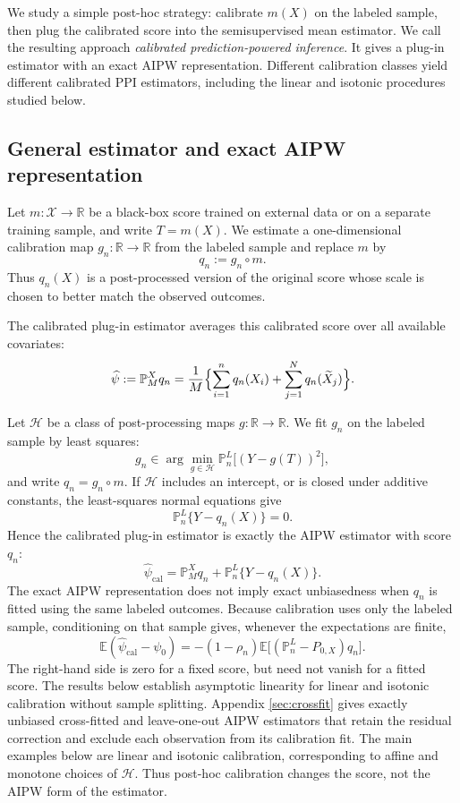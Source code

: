 \documentclass{article}
\theoremstyle{plain}
\theoremstyle{definition}
\newcommand{\E}{\mathbb{E}}
\newcommand{\1}{\mathbf{1}}
\newcommand{\psihat}{\widehat{\psi}_{\mathrm{cal}}}
\newcommand{\mtilde}{q_n}
\newcommand{\Pl}{\mathbb{P}^{L}_n}
\newcommand{\Pmx}{\mathbb{P}^{X}_M}
\newcommand{\Px}{P_{0,X}}
\begin{document}
We study a simple post-hoc strategy: calibrate \(m(X)\) on the labeled sample,
then plug the calibrated score into the semisupervised mean estimator. We call
the resulting approach \emph{calibrated prediction-powered inference}. It gives
a plug-in estimator with an exact AIPW representation. Different calibration
classes yield different calibrated PPI estimators, including the linear and
isotonic procedures studied below.

\subsection{General estimator and exact AIPW representation}
Let \(m:\mathcal X\to\mathbb R\) be a black-box score trained on external data
or on a separate training sample, and write \(T=m(X)\). We estimate a
one-dimensional calibration map \(g_n:\mathbb R\to\mathbb R\) from the labeled sample and
replace \(m\) by
\[
q_n := g_n\circ m .
\]
Thus \(q_n(X)\) is a post-processed version of the original score whose
scale is chosen to better match the observed outcomes.

The calibrated plug-in estimator averages this calibrated score over all
available covariates:
\begin{equation}
\label{eq:plugin}
\widehat\psi
:=
\Pmx q_n = \frac{1}{M}\Bigl\{\sum_{i=1}^n q_n(X_i)+\sum_{j=1}^N q_n(\widetilde X_j)\Bigr\}.
\end{equation}

Let \(\mathcal H\) be a class of post-processing maps
\(g:\mathbb R\to\mathbb R\). We fit \(g_n\) on the labeled sample by least
squares:
\begin{equation}
\label{eq:H-erm}
g_n \in \arg\min_{g\in\mathcal H}
\Pl\bigl[(Y-g(T))^2\bigr],
\end{equation}
and write \(\mtilde=g_n\circ m\). If \(\mathcal H\) includes an intercept, or
is closed under additive constants, the least-squares normal equations give
\[
\Pl\{Y-\mtilde(X)\}=0.
\]
Hence the calibrated plug-in estimator is exactly the AIPW estimator with score
\(\mtilde\):
\begin{equation}
\label{eqn::aipwcal}
\psihat
=
\Pmx\mtilde
+ \Pl\{Y-\mtilde(X)\}.
\end{equation}
The exact AIPW representation does not imply exact unbiasedness when \(q_n\)
is fitted using the same labeled outcomes. Because calibration uses only the
labeled sample, conditioning on that sample gives, whenever the expectations
are finite,
\[
\E(\psihat-\psi_0)
=-(1-\rho_n)\E\bigl[(\Pl-\Px)q_n\bigr].
\]
The right-hand side is zero for a fixed score, but need not vanish for a fitted
score. The results below establish asymptotic linearity for linear and
isotonic calibration without sample splitting. Appendix \ref{sec:crossfit}
gives exactly unbiased cross-fitted and leave-one-out AIPW estimators that
retain the residual correction and exclude each observation from its
calibration fit.
The main examples below are linear and isotonic calibration, corresponding to
affine and monotone choices of \(\mathcal H\). Thus post-hoc calibration changes
the score, not the AIPW form of the estimator.
\end{document}
